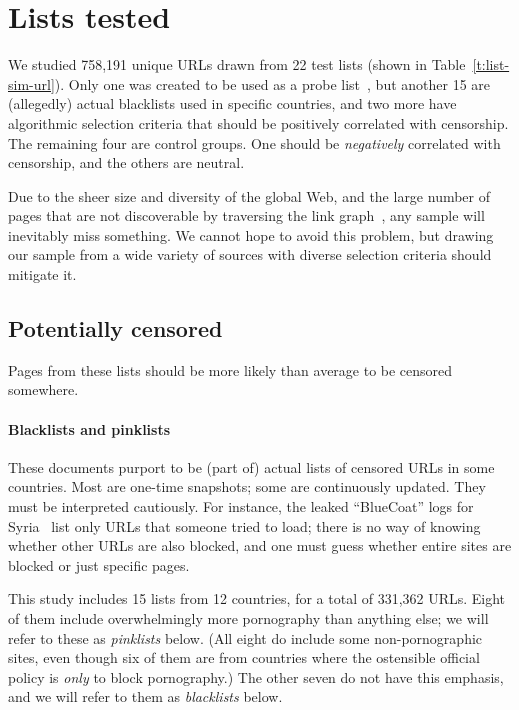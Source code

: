 \section{Lists tested}\label{s:lists}

We studied 758,191 unique URLs drawn from 22 test lists
(shown in Table~\ref{t:list-sim-url}).  Only one was
created to be used as a probe list~\cite{oni.nd.testlists}, but
another 15 are (allegedly) actual blacklists used in specific
countries, and two more have algorithmic selection criteria that
should be positively correlated with censorship.  The remaining four
are control groups.  One should be \emph{negatively} correlated with
censorship, and the others are neutral.

Due to the sheer size and diversity of the global Web, and the large
number of pages that are not discoverable by traversing the link
graph~\cite{biemann2013scalable}, any sample will inevitably miss
something.  We cannot hope to avoid this problem, but drawing our
sample from a wide variety of sources with diverse selection criteria
should mitigate it.

\subsection{Potentially censored}\label{s:lists-censored}

Pages from these lists should be more likely than average to be
censored somewhere.

\paragraph{Blacklists and pinklists}\label{s:lists-blacklists} These
documents purport to be (part of) actual lists of censored URLs in
some countries.  Most are one-time snapshots; some are continuously
updated.  They must be interpreted cautiously.  For instance, the
leaked “BlueCoat” logs for Syria~\cite{chaabane.2014.syria} list
only URLs that someone tried to load; there is no way of knowing
whether other URLs are also blocked, and one must guess whether entire
sites are blocked or just specific pages.

This study includes 15 lists from 12 countries, for a total of 331,362
URLs.  Eight of them include overwhelmingly more pornography than
anything else; we will refer to these as \emph{pinklists} below.  (All
eight do include some non-pornographic sites, even though six of them
are from countries where the ostensible official policy is \emph{only}
to block pornography.)  The other seven do not have this emphasis, and
we will refer to them as \emph{blacklists} below.

